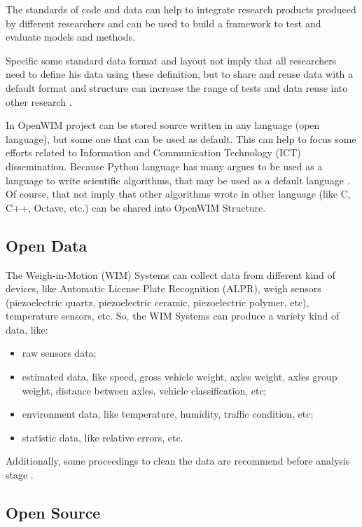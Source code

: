 \documentclass[a4paper]{article}
\begin{document}
{The standards of code and data can help to integrate research products produced by different researchers and can be used to build a framework to test and evaluate models and methods.

Specific some standard data format and layout not imply that all researchers need to define his data using these definition, but to share and reuse data with a default format and structure can increase the range of tests and data reuse into other research \cite{assante2015science, toby2015practices}.

In OpenWIM project can be stored source written in any language (open language), but some one that can be used as default. This can help to focus some efforts related to Information and Communication Technology (ICT) dissemination. Because Python language has many argues to be used as a language to write scientific algorithms, that may be used as a default language \cite{ayer2014scientists}. Of course, that not imply that other algorithms wrote in other language (like C, C++, Octave, etc.) can be shared into OpenWIM Structure.


\subsection{Open Data}\label{open-Data}

The Weigh-in-Motion (WIM) Systems can collect data from different kind of devices, like Automatic License Plate Recognition (ALPR), weigh sensors (piezoelectric quartz, piezoelectric ceramic, piezoelectric polymer, etc), temperature sensors, etc. So, the WIM Systems can produce a variety kind of data, like:

\begin{itemize}
\item raw sensors data;
\item estimated data, like speed, gross vehicle weight, axles weight, axles group weight, distance between axles, vehicle classification, etc;
\item environment data, like temperature, humidity, traffic condition, etc;
\item statistic data, like relative errors, etc.
\end{itemize}

Additionally, some proceedings to clean the data are recommend before analysis stage \cite{elkins2008development, enright2011cleaning}.

\subsection{Open Source}\label{open-source}

}
\end{document}

